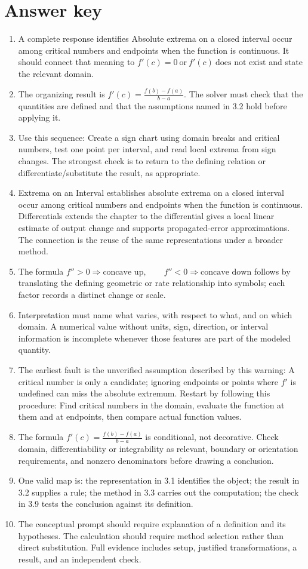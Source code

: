 \documentclass[11pt]{article}
\begin{document}
\section{Answer key}
\small
\begin{enumerate}
\item A complete response identifies Absolute extrema on a closed interval occur among critical numbers and endpoints when the function is continuous. It should connect that meaning to \(f'(c)=0\ \text{or}\ f'(c)\ \text{does not exist}\) and state the relevant domain.
\item The organizing result is \(f'(c)=\frac{f(b)-f(a)}{b-a}\). The solver must check that the quantities are defined and that the assumptions named in 3.2 hold before applying it.
\item Use this sequence: Create a sign chart using domain breaks and critical numbers, test one point per interval, and read local extrema from sign changes. The strongest check is to return to the defining relation or differentiate/substitute the result, as appropriate.
\item Extrema on an Interval establishes absolute extrema on a closed interval occur among critical numbers and endpoints when the function is continuous. Differentials extends the chapter to the differential gives a local linear estimate of output change and supports propagated-error approximations. The connection is the reuse of the same representations under a broader method.
\item The formula \(f''>0\Rightarrow\text{concave up},\qquad f''<0\Rightarrow\text{concave down}\) follows by translating the defining geometric or rate relationship into symbols; each factor records a distinct change or scale.
\item Interpretation must name what varies, with respect to what, and on which domain. A numerical value without units, sign, direction, or interval information is incomplete whenever those features are part of the modeled quantity.
\item The earliest fault is the unverified assumption described by this warning: A critical number is only a candidate; ignoring endpoints or points where $f'$ is undefined can miss the absolute extremum. Restart by following this procedure: Find critical numbers in the domain, evaluate the function at them and at endpoints, then compare actual function values.
\item The formula \(f'(c)=\frac{f(b)-f(a)}{b-a}\) is conditional, not decorative. Check domain, differentiability or integrability as relevant, boundary or orientation requirements, and nonzero denominators before drawing a conclusion.
\item One valid map is: the representation in 3.1 identifies the object; the result in 3.2 supplies a rule; the method in 3.3 carries out the computation; the check in 3.9 tests the conclusion against its definition.
\item The conceptual prompt should require explanation of a definition and its hypotheses. The calculation should require method selection rather than direct substitution. Full evidence includes setup, justified transformations, a result, and an independent check.
\end{enumerate}
\end{document}
